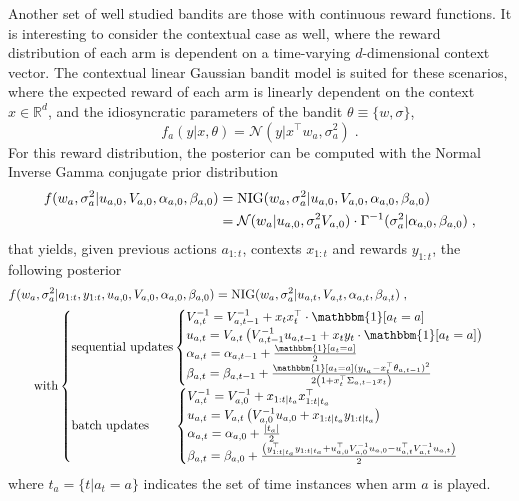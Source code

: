 \documentclass{article}
\def \Real{{\mathbb R}}
\newcommand{\N}{\mathcal{N}}
\newcommand{\NIG}{{\rm NIG}}
\begin{document}
Another set of well studied bandits are those with continuous reward functions. It is interesting to consider the contextual case as well, where the reward distribution of each arm is dependent on a time-varying $d$-dimensional context vector. The contextual linear Gaussian bandit model is suited for these scenarios, where the expected reward of each arm is linearly dependent on the context $x\in\Real^{d}$, and the idiosyncratic parameters of the bandit $\theta\equiv\{w, \sigma\}$,
\begin{equation}
f_a(y|x,\theta)=\N(y|x^\top w_a, \sigma_a^2) \; .
\end{equation}
For this reward distribution, the posterior can be computed with the Normal Inverse Gamma conjugate prior distribution
\begin{equation}
\begin{split}
f(w_a, \sigma_a^2|u_{a,0}, V_{a,0},\alpha_{a,0}, \beta_{a,0}) &=\NIG(w_a, \sigma_a^2|u_{a,0}, V_{a,0},\alpha_{a,0}, \beta_{a,0}) \\
&= \N(w_a|u_{a,0}, \sigma_a^2 V_{a,0}) \cdot \Gamma^{-1}(\sigma_a^2|\alpha_{a,0}, \beta_{a,0}) \;, \\
\end{split}
\end{equation}
that yields, given previous actions $a_{1:t}$, contexts $x_{1:t}$ and rewards $y_{1:t}$, the following posterior
\begin{equation}\begin{split}
& f(w_a, \sigma_a^2|a_{1:t},y_{1:t},u_{a,0}, V_{a,0},\alpha_{a,0}, \beta_{a,0}) =\NIG(w_a, \sigma_a^2|u_{a,t}, V_{a,t},\alpha_{a,t}, \beta_{a,t}) \; ,\\
& \qquad \text{with} \begin{cases}
\text{sequential updates} \begin{cases}
V_{a,t}^{-1} = V_{a,t-1}^{-1} + x_t x_t^\top \cdot \mathbbm{1}[a_t=a]\\
u_{a,t}= V_{a,t} \left( V_{a,t-1}^{-1} u_{a,t-1} + x_t y_{t}\cdot \mathbbm{1}[a_t=a]\right) \\
\alpha_{a,t}=\alpha_{a,t-1} + \frac{\mathbbm{1}[a_t=a]}{2} \\
\beta_{a,t}=\beta_{a,t-1} + \frac{\mathbbm{1}[a_t=a](y_{t_a}-x_t^\top\theta_{a,t-1})^2}{2\left(1+x_t^\top \Sigma_{a,t-1} x_t\right)}
\end{cases} \\
\text{batch updates} \qquad \begin{cases}
V_{a,t}^{-1}= V_{a,0}^{-1}+x_{{1:t}|t_a} x_{{1:t}|t_a}^\top\\
u_{a,t}=V_{a,t}\left(V_{a,0}^{-1}u_{a,0}+x_{{1:t}|t_a} y_{{1:t}|t_a}\right)\\
\alpha_{a,t}=\alpha_{a,0} + \frac{|t_a|}{2} \\
\beta_{a,t}=\beta_{a,0} + \frac{\left(y_{{1:t}|t_a}^\top y_{{1:t}|t_a} + u_{a,0}^\top V_{a,0}^{-1}u_{a,0} - u_{a,t}^\top V_{a,t}^{-1}u_{a,t} \right)}{2} 
\end{cases}
\end{cases}
\end{split}
\end{equation}
where $t_a=\{t|a_t=a\}$ indicates the set of time instances when arm $a$ is played.
\end{document}
